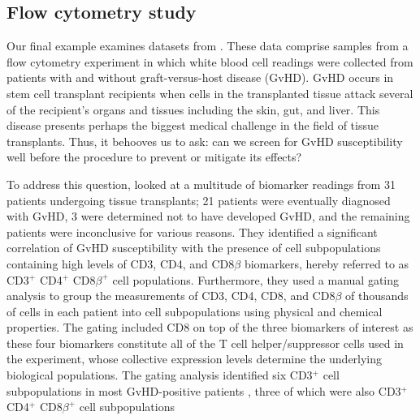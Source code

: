 \documentclass{uwstat572}
\renewcommand\;{\,}
\begin{document}
\subsection{Flow cytometry study}\label{GvHD}
Our final example examines datasets from \cite{Brinkman07}.
These data comprise samples from a flow cytometry experiment in which white blood cell readings were collected from patients with and without graft-versus-host disease (GvHD).
GvHD occurs in stem cell transplant recipients when cells in the transplanted tissue attack several of the recipient's organs and tissues including the skin, gut, and liver.
This disease presents perhaps the biggest medical challenge in the field of tissue transplants.
Thus, it behooves us to ask: can we screen for GvHD susceptibility well before the procedure to prevent or mitigate its effects?

To address this question, \cite{Brinkman07} looked at a multitude of biomarker readings from 31 patients undergoing tissue transplants; 21 patients were eventually diagnosed with GvHD, 3 were determined not to have developed GvHD, and the remaining patients were inconclusive for various reasons.
They identified a significant correlation of GvHD susceptibility with the presence of cell subpopulations containing high levels of CD3, CD4, and CD8$\beta$ biomarkers, hereby referred to as CD3$^+$ CD4$^+$ CD8$\beta^+$ cell populations.
Furthermore, they used a manual gating analysis to group the measurements of CD3, CD4, CD8, and CD8$\beta$ of thousands of cells in each patient into cell subpopulations using physical and chemical properties.
The gating included CD8 on top of the three biomarkers of interest as these four biomarkers constitute all of the T cell helper/suppressor cells used in the experiment, whose collective expression levels determine the underlying biological populations.
The gating analysis identified six CD3$^+$ cell subpopulations in most GvHD-positive patients , three of which were also 
CD3$^+$ CD4$^+$ CD8$\beta^+$ cell subpopulations
\end{document}

